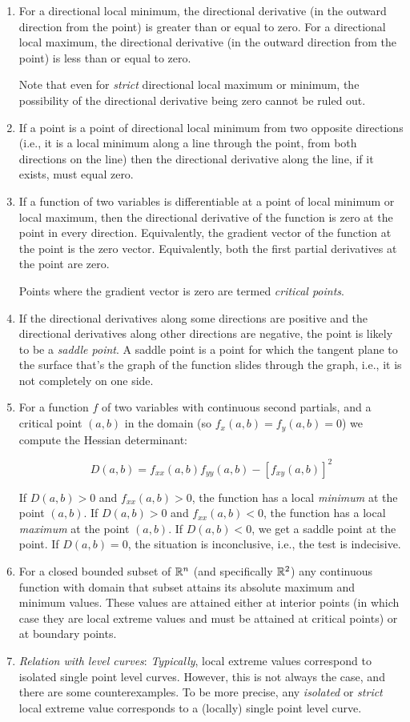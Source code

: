 \documentclass[10pt]{amsart}
\begin{document}
\begin{enumerate}
\item For a directional local minimum, the directional derivative (in
  the outward direction from the point) is greater than or equal to
  zero. For a directional local maximum, the directional derivative
  (in the outward direction from the point) is less than or equal to
  zero.

  Note that even for {\em strict} directional local maximum or
  minimum, the possibility of the directional derivative being zero
  cannot be ruled out.
\item If a point is a point of directional local minimum from two
  opposite directions (i.e., it is a local minimum along a line
  through the point, from both directions on the line) then the
  directional derivative along the line, if it exists, must equal
  zero.
\item If a function of two variables is differentiable at a point of
  local minimum or local maximum, then the directional derivative of
  the function is zero at the point in every direction. Equivalently,
  the gradient vector of the function at the point is the zero
  vector. Equivalently, both the first partial derivatives at the
  point are zero.
  
  Points where the gradient vector is zero are termed {\em critical
  points}. 
\item If the directional derivatives along some directions are
  positive and the directional derivatives along other directions are
  negative, the point is likely to be a {\em saddle point}. A saddle
  point is a point for which the tangent plane to the surface that's
  the graph of the function slides through the graph, i.e., it is not
  completely on one side.
\item For a function $f$ of two variables with continuous second
  partials, and a critical point $(a,b)$ in the domain (so $f_x(a,b) =
  f_y(a,b) = 0$) we compute the Hessian determinant:

  $$D(a,b) = f_{xx}(a,b)f_{yy}(a,b) - [f_{xy}(a,b)]^2$$

  If $D(a,b) > 0$ and $f_{xx}(a,b) > 0$, the function has a local {\em
  minimum} at the point $(a,b)$. If $D(a,b) > 0$ and $f_{xx}(a,b) <
  0$, the function has a local {\em maximum} at the point $(a,b)$. If
  $D(a,b) < 0$, we get a saddle point at the point. If $D(a,b) = 0$,
  the situation is inconclusive, i.e., the test is indecisive.
\item For a closed bounded subset of $\mathbb{R}^n$ (and specifically $\mathbb{R}^2$)
  any continuous function with domain that subset attains its absolute
  maximum and minimum values. These values are attained either at
  interior points (in which case they are local extreme values and
  must be attained at critical points) or at boundary points.
\item {\em Relation with level curves}: {\em Typically}, local extreme
  values correspond to isolated single point level curves. However,
  this is not always the case, and there are some counterexamples. To
  be more precise, any {\em isolated} or {\em strict} local extreme
  value corresponds to a (locally) single point level curve.
\end{enumerate}
\end{document}
